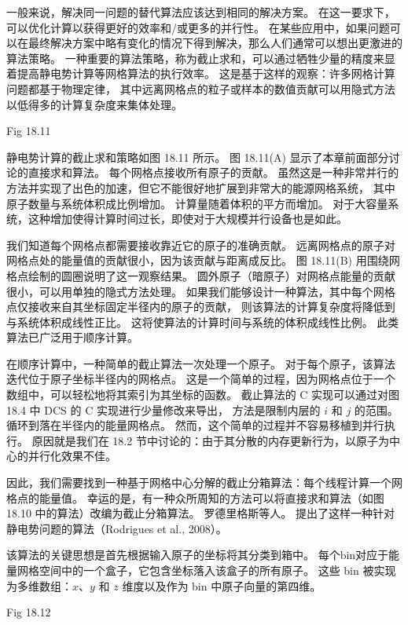 一般来说，解决同一问题的替代算法应该达到相同的解决方案。 在这一要求下，可以优化计算以获得更好的效率和/或更多的并行性。 
在某些应用中，如果问题可以在最终解决方案中略有变化的情况下得到解决，那么人们通常可以想出更激进的算法策略。 
一种重要的算法策略，称为截止求和，可以通过牺牲少量的精度来显着提高静电势计算等网格算法的执行效率。 
这是基于这样的观察：许多网格计算问题都基于物理定律，
其中远离网格点的粒子或样本的数值贡献可以用隐式方法以低得多的计算复杂度来集体处理。

{\color{red} Fig 18.11}

静电势计算的截止求和策略如图 18.11 所示。 图 18.11(A) 显示了本章前面部分讨论的直接求和算法。 
每个网格点接收所有原子的贡献。 虽然这是一种非常并行的方法并实现了出色的加速，但它不能很好地扩展到非常大的能源网格系统，
其中原子数量与系统体积成比例增加。 计算量随着体积的平方而增加。 
对于大容量系统，这种增加使得计算时间过长，即使对于大规模并行设备也是如此。

我们知道每个网格点都需要接收靠近它的原子的准确贡献。 远离网格点的原子对网格点处的能量值的贡献很小，因为该贡献与距离成反比。 
图 18.11(B) 用围绕网格点绘制的圆圈说明了这一观察结果。 
圆外原子（暗原子）对网格点能量的贡献很小，可以用单独的隐式方法处理。 
如果我们能够设计一种算法，其中每个网格点仅接收来自其坐标固定半径内的原子的贡献，
则该算法的计算复杂度将降低到与系统体积成线性正比。 这将使算法的计算时间与系统的体积成线性比例。 此类算法已广泛用于顺序计算。

在顺序计算中，一种简单的截止算法一次处理一个原子。 
对于每个原子，该算法迭代位于原子坐标半径内的网格点。 
这是一个简单的过程，因为网格点位于一个数组中，可以轻松地将其索引为其坐标的函数。 
截止算法的 $\mathrm{C}$ 实现可以通过对图 18.4 中 DCS 的 $\mathrm{C}$ 实现进行少量修改来导出，
方法是限制内层的 $i$ 和 $j$ 的范围。 循环到落在半径内的能量网格点。 然而，这个简单的过程并不容易移植到并行执行。 
原因就是我们在 18.2 节中讨论的：由于其分散的内存更新行为，以原子为中心的并行化效果不佳。

因此，我们需要找到一种基于网格中心分解的截止分箱算法：每个线程计算一个网格点的能量值。 
幸运的是，有一种众所周知的方法可以将直接求和算法（如图 18.10 中的算法）改编为截止分箱算法。 
罗德里格斯等人。 提出了这样一种针对静电势问题的算法（Rodrigues et al., 2008）。

该算法的关键思想是首先根据输入原子的坐标将其分类到箱中。 
每个bin对应于能量网格空间中的一个盒子，它包含坐标落入该盒子的所有原子。 
这些 bin 被实现为多维数组：$x、y$ 和 $z$ 维度以及作为 bin 中原子向量的第四维。

{\color{red} Fig 18.12}

